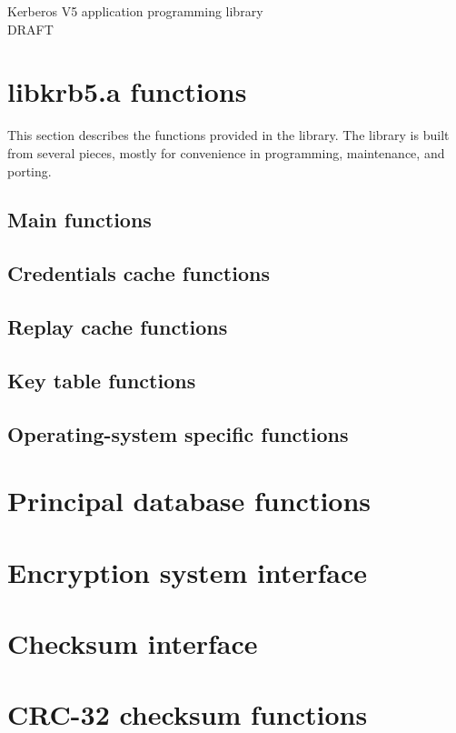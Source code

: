 \setlength{\oddsidemargin}{0.25in}
\setlength{\evensidemargin}{-0.25in}
\setlength{\topmargin}{-.5in}
\setlength{\textheight}{9in}
\setlength{\parskip}{.1in}
\setlength{\parindent}{2em}
\setlength{\textwidth}{6.25in}
\makeindex
\pagestyle{headings}
\newif\ifdraft
\drafttrue
{}

\begin{center}
{\Huge Kerberos V5 application programming library} \\
{\Large DRAFT}
\end{center}
\section{libkrb5.a functions}
This section describes the functions provided in the 
library.  The library is built from several pieces, mostly for convenience in
programming, maintenance, and porting.

\ifdraft\sloppy\fi

\subsection{Main functions}


\subsection{Credentials cache functions}


\subsection{Replay cache functions}


\subsection{Key table functions}


\subsection{Operating-system specific functions}


\section{Principal database functions}



\section{Encryption system interface}


\section{Checksum interface}


\section{CRC-32 checksum functions}


\appendix
\cleardoublepage


